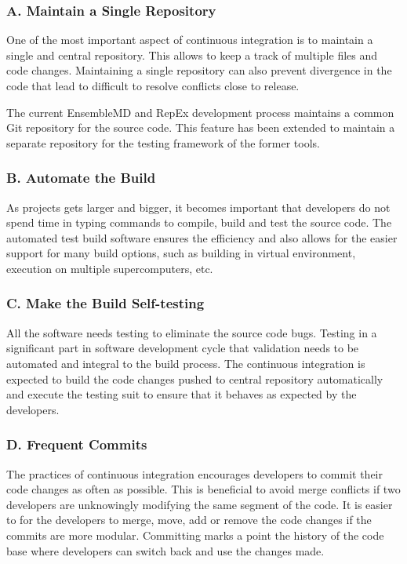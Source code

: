 \documentclass[10pt]{ruthesis}
\begin{document}
\subsubsection{\textbf{A. Maintain a Single Repository}}
One of the most important aspect of continuous integration is to maintain a single and central repository. This allows to keep a track of multiple files and code changes. Maintaining a single repository can also prevent divergence in the code that lead to difficult to resolve conflicts close to release. 

The current EnsembleMD and RepEx development process maintains a common Git repository for the source code. This feature has been extended to maintain a separate repository for the testing framework of the former tools.

\subsubsection{\textbf{B. Automate the Build}}
As projects gets larger and bigger, it becomes important that developers do not spend time in typing commands to compile, build and test the source code. The automated test build software ensures the efficiency and also allows for the easier support for many build options, such as building in virtual environment, execution on multiple supercomputers, etc.

\subsubsection{\textbf{C. Make the Build Self-testing}}
All the software needs testing to eliminate the source code bugs. Testing in a significant part in software development cycle that validation needs to be automated and integral to the build process. The continuous integration is expected to build the code changes pushed to central repository automatically and execute the testing suit to ensure that it behaves as expected by the developers. 

\subsubsection{\textbf{D. Frequent Commits}}
The practices of continuous integration encourages developers to commit their code changes as often as possible. This is beneficial to avoid merge conflicts if two developers are unknowingly modifying the same segment of the code. It is easier to for the developers to merge, move, add or remove the code changes if the commits are more modular. Committing marks a point the history of the code base where developers can switch back and use the changes made.
\end{document}
